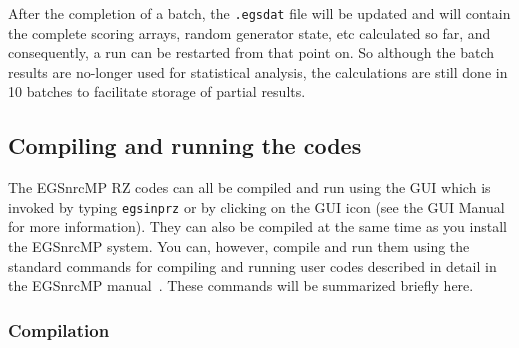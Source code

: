 \documentclass[12pt,twoside]{article}  %
\begin{document}
After the completion of a batch, the \verb+.egsdat+ file will be
updated and will contain the complete scoring arrays, random generator
state, etc calculated so far, and consequently, a run can be restarted
from that point on. So although the batch results are no-longer used for
statistical analysis, the calculations are still done in 10 batches to
facilitate storage of partial results.


\subsection{Compiling and running the codes}

The EGSnrcMP RZ codes can all be compiled and run using the
GUI which is invoked by typing {\tt egsinprz} or by clicking on the GUI icon
(see the GUI Manual~\cite{Ma03} for more information).
They can also be compiled at the same time as you install the EGSnrcMP
system.
You can, however, compile and run them using the standard
commands for compiling and running user codes described in detail
in the EGSnrcMP manual~\cite{Ka03}.  These commands will be summarized
briefly here.

\subsubsection{Compilation}
\label{compilesect}
\end{document}
